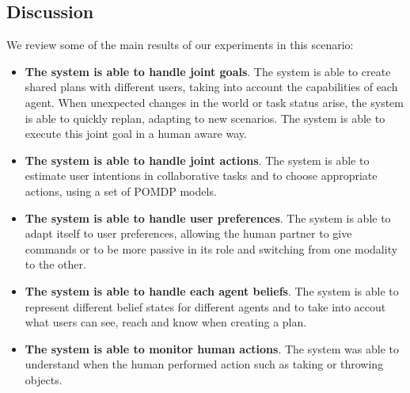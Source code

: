 \subsection{Discussion}
We review some of the main results of our experiments in this scenario:
\begin{itemize}

\item
\textbf{The system is able to handle joint goals}.
The system is able to create shared plans with different users, taking
into account the capabilities of each agent. When unexpected changes
in the world or task status arise, the system is able to quickly
replan, adapting to new scenarios. The system is able to execute this
joint goal in a human aware way. 
                                
\item
\textbf{The system is able to handle joint actions}.
The system is able to estimate user intentions in collaborative tasks and to choose appropriate actions, using a set of POMDP models.

\item
\textbf{The system is able to handle user preferences}.
The system is able to adapt itself to user preferences, allowing the
human partner to give commands or to be more passive in its role and
switching from one modality to the other. 
\item
\textbf{The system is able to handle each agent beliefs}.
The system is able to represent different belief states for different agents and to take into accout what users can see, reach and know when creating a plan.

\item
\textbf{The system is able to monitor human actions}.
The system was able to understand when the human performed action such as taking or throwing objects.
\end{itemize}

